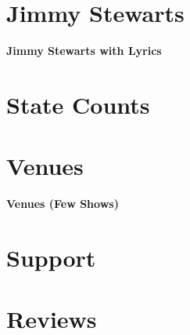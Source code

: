 \documentclass[8pt]{book}
\makeatletter
\let\mcnewpage=\newpage
\newcommand{\TrickSupertabularIntoMulticols}{
\renewcommand\newpage{
    \if@firstcolumn
        \hrule width\linewidth height0pt
            \columnbreak
        \else
          \mcnewpage
        \fi
}}
\makeatother
\begin{document}
\chapter{Jimmy Stewarts}

\begin{multicols*}{3}
\TrickSupertabularIntoMulticols

\begin{center}\Large{\textbf{Jimmy Stewarts with Lyrics}}\end{center}

\end{multicols*}

\chapter{State Counts}

\setlength{\tabcolsep}{5pt}
\begin{multicols*}{2}
\TrickSupertabularIntoMulticols

\end{multicols*}

\chapter{Venues}

\begin{multicols*}{3}
\TrickSupertabularIntoMulticols
\noindent

\end{multicols*}
\newpage
\begin{Large}\noindent\textbf{Venues (Few Shows)}\end{Large}


\chapter{Support}

\begin{multicols*}{3}
\TrickSupertabularIntoMulticols
\noindent

\end{multicols*}


\chapter{Reviews}

\begin{multicols*}{2}
\TrickSupertabularIntoMulticols
\noindent

\end{multicols*}
\end{document}
